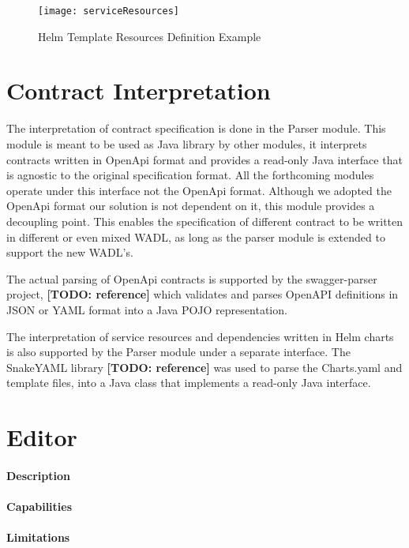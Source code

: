 \begin{figure}[htbp]
    \centering
    \texttt{[image: serviceResources]}
    \caption{Helm Template Resources Definition Example}
    \label{fig:serviceResources}
\end{figure}

\section{Contract Interpretation} %
\label{sec:contract_interpretation}

The interpretation of contract specification is done in the Parser module.
This module is meant to be used as Java library by other modules,
it interprets contracts written in OpenApi format and provides a read-only Java interface
that is agnostic to the original specification format.
All the forthcoming modules operate under this interface not the OpenApi format.
Although we adopted the OpenApi format our solution is not dependent on it, this module provides a decoupling point.
This enables the specification of different contract to be written in different or even mixed WADL,
as long as the parser module is extended to support the new WADL's.

The actual parsing of OpenApi contracts is supported by the swagger-parser project, \textbf{[TODO: reference]}
which validates and parses OpenAPI definitions in JSON or YAML format into a Java POJO representation.

The interpretation of service resources and dependencies written in Helm charts is also supported by the Parser module under a separate interface.
The SnakeYAML library \textbf{[TODO: reference]} was used to parse the Charts.yaml and template files, into a Java class that implements a read-only Java interface.


\section{Editor} %
\label{sec:editor}

\paragraph{Description}
\paragraph{Capabilities}
\paragraph{Limitations}
